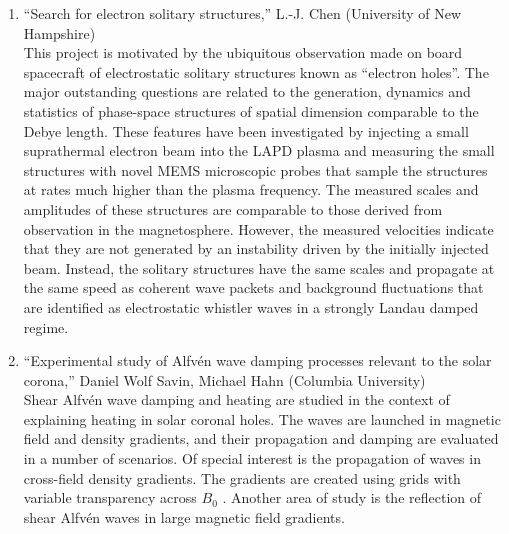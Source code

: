 \documentclass[11pt]{article}
\begin{document}
\begin{enumerate}
\item ``Search for electron solitary structures,'' L.-J. Chen
  (University of New Hampshire)\\
This project is motivated by the ubiquitous observation made on board
spacecraft of electrostatic solitary structures known as ``electron
holes''. The major outstanding questions are related to the generation,
dynamics and statistics of phase-space structures of spatial dimension
comparable to the Debye length. These features have been investigated
by injecting a small suprathermal electron beam into the LAPD plasma
and measuring the small structures with novel MEMS microscopic probes
that sample the structures at rates much higher than the plasma
frequency. The measured scales and amplitudes of these structures are
comparable to those derived from observation in the
magnetosphere. However, the measured velocities indicate that they are
not generated by an instability driven by the initially injected
beam. Instead, the solitary structures have the same scales and
propagate at the same speed as coherent wave packets and background
fluctuations that are  identified as electrostatic
whistler waves in a strongly Landau damped regime.


\item ``Experimental study of Alfv\'{e}n wave damping processes
  relevant to the solar corona,'' Daniel Wolf Savin, Michael Hahn
  (Columbia University) \\ Shear
  Alfv\'{e}n wave damping and heating are studied in the context
  of explaining heating in solar coronal holes. The waves are
  launched in magnetic field and density gradients, and their
  propagation and  damping are evaluated in a number
  of scenarios. Of special interest is the propagation of waves in
  cross-field density gradients. The gradients are created using
  grids with variable transparency across $B_{0}$ . Another area of
  study is the reflection of shear Alfv\'{e}n waves in large
  magnetic field gradients.




\end{enumerate}
\end{document}
